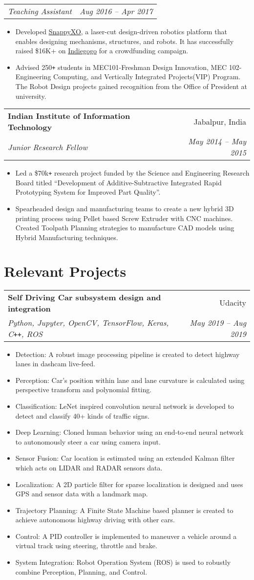 \documentclass[letterpaper,10pt]{article}
\makeatletter
\newcommand{\resumeHeading}[4]{
  \vspace{-1pt}
    \begin{tabular*}{0.97\textwidth}{l@{\extracolsep{\fill}}r}
      \textbf{#1} & #2 \vspace{-2pt}\\ \vspace{1pt}
      \textit{\small#3} & \textit{\small #4} \\
    \end{tabular*}
}
\newcommand{\resumeSubheadingWithDate}[2]{
    \begin{tabular*}{0.97\textwidth}{l@{\extracolsep{\fill}}r}
      \textit{\small#1} & \textit{\small #2}\\
    \end{tabular*}
    \vspace{+2pt}
}
\newcommand{\resumeSection}[1]{
\vspace{-12pt}
\section{\textbf{#1}}
}
\newcommand{\resumeItemListStart}{
\vspace{-7pt}
\begin{itemize}[leftmargin=14pt]
}
\newcommand{\resumeItemListEnd}{
\vspace{+7pt}
\end{itemize}
}
\newcommand{\resumeItem}[1]{
  \item\small{
      {#1 \vspace{-7pt}
      }
  }
}
\makeatother
\begin{document}
    \vspace{-5pt}
    \resumeSubheadingWithDate{Teaching Assistant}{Aug 2016 -- Apr 2017}
    \resumeItemListStart
    \resumeItem{Developed \href{http://snappyxo.com/}{SnappyXO}, a laser-cut design-driven robotics platform that enables designing mechanisms, structures, and robots. It has successfully raised \$16K+ on \href{https://www.indiegogo.com/projects/snappyxo-a-design-driven-robotics-education-kit}{Indiegogo} for a crowdfunding campaign.}
    \resumeItem{Advised 250\texttt{+} students in MEC101-Freshman Design Innovation, MEC 102-Engineering Computing, and Vertically Integrated Projects(VIP) Program. The Robot Design projects gained recognition from the Office of President at university.}
    \resumeItemListEnd
    
    \resumeHeading
    {Indian Institute of Information Technology}{Jabalpur, India}
    {Junior Research Fellow}{May 2014 -- May 2015}
    \resumeItemListStart
    \resumeItem{Led a \$70k\texttt{+} research project funded by the Science and Engineering Research Board titled “Development of Additive-Subtractive Integrated Rapid Prototyping System for Improved Part Quality”.}
    \resumeItem{Spearheaded design and manufacturing teams to create a new hybrid 3D printing process using Pellet based Screw Extruder with CNC machines. Created Toolpath Planning strategies to manufacture CAD models using Hybrid Manufacturing techniques.}
    \resumeItemListEnd



\resumeSection{Relevant Projects}
    
    \resumeHeading{Self Driving Car subsystem design and integration}{Udacity}{Python, Jupyter, OpenCV, TensorFlow, Keras, C\texttt{++}, ROS}{May 2019 -- Aug 2019}
    \resumeItemListStart
    \resumeItem{Detection: A robust image processing pipeline is created to detect highway lanes in dashcam live-feed.}
    \resumeItem{Perception: Car's position within lane and lane curvature is calculated using perspective transform and polynomial fitting.}
    \resumeItem{Classification: LeNet inspired convolution neural network is developed to detect and classify 40+ kinds of traffic signs.}
    \resumeItem{Deep Learning: Cloned human behavior using an end-to-end neural network to autonomously steer a car using camera input.}
    \resumeItem{Sensor Fusion: Car location is estimated using an extended Kalman filter which acts on LIDAR and RADAR sensors data.}
    \resumeItem{Localization: A 2D particle filter for sparse localization is designed and uses GPS and sensor data with a landmark map.}
    \resumeItem{Trajectory Planning: A Finite State Machine based planner is created to achieve autonomous highway driving with other cars.}
    \resumeItem{Control: A PID controller is implemented to maneuver a vehicle around a virtual track using steering, throttle and brake.}
    \resumeItem{System Integration: Robot Operation System (ROS) is used to robustly combine Perception, Planning, and Control.}
    \resumeItemListEnd
    
\end{document}

